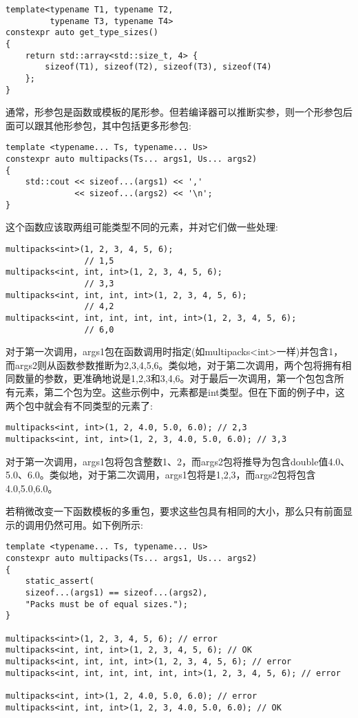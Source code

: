 \begin{lstlisting}[style=styleCXX]
template<typename T1, typename T2,
         typename T3, typename T4>
constexpr auto get_type_sizes()
{
	return std::array<std::size_t, 4> {
		sizeof(T1), sizeof(T2), sizeof(T3), sizeof(T4)
	};
}
\end{lstlisting}

通常，形参包是函数或模板的尾形参。但若编译器可以推断实参，则一个形参包后面可以跟其他形参包，其中包括更多形参包:

\begin{lstlisting}[style=styleCXX]
template <typename... Ts, typename... Us>
constexpr auto multipacks(Ts... args1, Us... args2)
{
	std::cout << sizeof...(args1) << ','
	          << sizeof...(args2) << '\n';
}
\end{lstlisting}

这个函数应该取两组可能类型不同的元素，并对它们做一些处理:

\begin{lstlisting}[style=styleCXX]
multipacks<int>(1, 2, 3, 4, 5, 6);
                // 1,5
multipacks<int, int, int>(1, 2, 3, 4, 5, 6);
                // 3,3
multipacks<int, int, int, int>(1, 2, 3, 4, 5, 6);
                // 4,2
multipacks<int, int, int, int, int, int>(1, 2, 3, 4, 5, 6);
                // 6,0
\end{lstlisting}

对于第一次调用，args1包在函数调用时指定(如multipacks<int>一样)并包含1，而args2则从函数参数推断为2,3,4,5,6。类似地，对于第二次调用，两个包将拥有相同数量的参数，更准确地说是1,2,3和3,4,6。对于最后一次调用，第一个包包含所有元素，第二个包为空。这些示例中，元素都是int类型。但在下面的例子中，这两个包中就会有不同类型的元素了:

\begin{lstlisting}[style=styleCXX]
multipacks<int, int>(1, 2, 4.0, 5.0, 6.0); // 2,3
multipacks<int, int, int>(1, 2, 3, 4.0, 5.0, 6.0); // 3,3
\end{lstlisting}

对于第一次调用，args1包将包含整数1、2，而args2包将推导为包含double值4.0、5.0、6.0。类似地，对于第二次调用，args1包将是1,2,3，而args2包将包含4.0,5.0,6.0。

若稍微改变一下函数模板的多重包，要求这些包具有相同的大小，那么只有前面显示的调用仍然可用。如下例所示:

\begin{lstlisting}[style=styleCXX]
template <typename... Ts, typename... Us>
constexpr auto multipacks(Ts... args1, Us... args2)
{
	static_assert(
	sizeof...(args1) == sizeof...(args2),
	"Packs must be of equal sizes.");
}

multipacks<int>(1, 2, 3, 4, 5, 6); // error
multipacks<int, int, int>(1, 2, 3, 4, 5, 6); // OK
multipacks<int, int, int, int>(1, 2, 3, 4, 5, 6); // error
multipacks<int, int, int, int, int, int>(1, 2, 3, 4, 5, 6); // error

multipacks<int, int>(1, 2, 4.0, 5.0, 6.0); // error
multipacks<int, int, int>(1, 2, 3, 4.0, 5.0, 6.0); // OK
\end{lstlisting}

